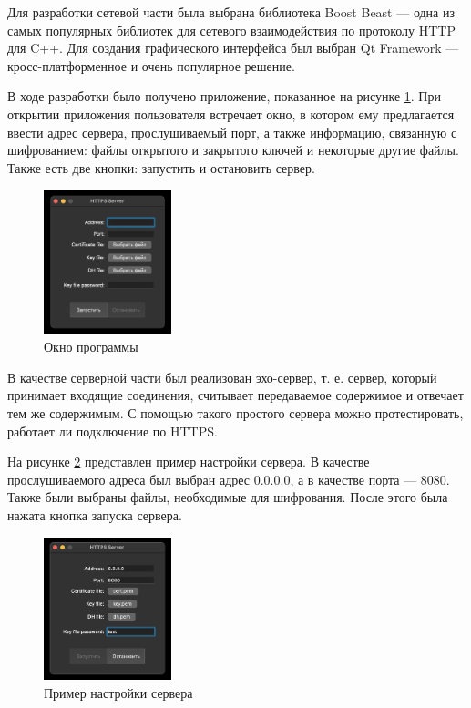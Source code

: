 \documentclass[a4paper, 14pt]{extarticle}
\begin{document}
Для разработки сетевой части была выбрана библиотека
\foreignlanguage{english}{Boost Beast} --- одна из самых популярных библиотек
для сетевого взаимодействия по протоколу \foreignlanguage{english}{HTTP} для
C++. Для создания графического интерфейса был выбран
\foreignlanguage{english}{Qt Framework} --- кросс-платформенное и очень
популярное решение.

В ходе разработки было получено приложение, показанное на рисунке \ref{fig:1}.
При открытии приложения пользователя встречает окно, в котором ему предлагается
ввести адрес сервера, прослушиваемый порт, а также информацию, связанную с
шифрованием: файлы открытого и закрытого ключей и некоторые другие файлы. Также
есть две кнопки: запустить и остановить сервер.

\begin{figure}[H]
  \centering
  \includegraphics[width=0.33\textwidth]{images/1.png}
  \caption{Окно программы}
  \label{fig:1}
\end{figure}

В качестве серверной части был реализован эхо-сервер, т. е. сервер, который
принимает входящие соединения, считывает передаваемое содержимое и отвечает тем
же содержимым. С помощью такого простого сервера можно протестировать, работает
ли подключение по \foreignlanguage{english}{HTTPS}.

На рисунке \ref{fig:2} представлен пример настройки сервера. В качестве
прослушиваемого адреса был выбран адрес 0.0.0.0, а в качестве порта --- 8080.
Также были выбраны файлы, необходимые для шифрования. После этого была нажата
кнопка запуска сервера.

\begin{figure}[H]
  \centering
  \includegraphics[width=0.33\textwidth]{images/2.png}
  \caption{Пример настройки сервера}
  \label{fig:2}
\end{figure}
\end{document}
